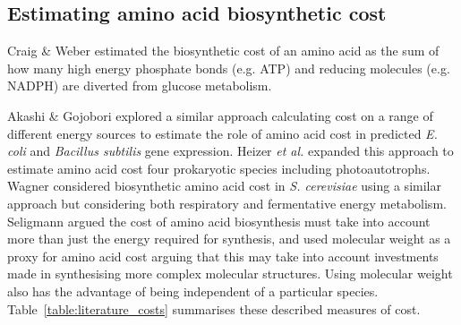 \subsection{Estimating amino acid biosynthetic cost}%

Craig \& Weber \cite{craig1998} estimated the biosynthetic cost of an amino acid as the sum of how many high energy phosphate bonds (e.g. ATP) and reducing molecules (e.g. NADPH) are diverted from glucose metabolism.

Akashi \& Gojobori \cite{akashi2002} explored a similar approach calculating cost on a range of different energy sources to estimate the role of amino acid cost in predicted \emph{E. coli} and \emph{Bacillus subtilis} gene expression. Heizer \emph{et al.} \cite{heizer2006} expanded this approach to estimate amino acid cost four prokaryotic species including photoautotrophs. Wagner considered biosynthetic amino acid cost in \emph{S. cerevisiae} using a similar approach but considering both respiratory and fermentative energy metabolism. Seligmann argued \cite{seligmann2003} the cost of amino acid biosynthesis must take into account more than just the energy required for synthesis, and used molecular weight as a proxy for amino acid cost arguing that this may take into account investments made in synthesising more complex molecular structures. Using molecular weight also has the advantage of being independent of a particular species. Table~\ref{table:literature_costs} summarises these described measures of cost.

